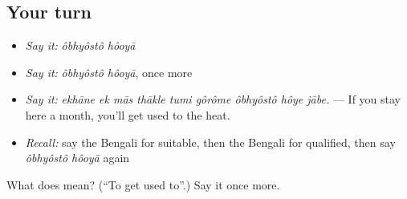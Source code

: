 \subsection*{Your turn}
\begin{itemize}
\raggedright
  \item \emph{Say it:} \emph{ôbhyôstô hôoyā}
  \item \emph{Say it:} \emph{ôbhyôstô hôoyā}, once more
  \item \emph{Say it:} \emph{ekhāne ek mās thākle tumi gôrôme ôbhyôstô hôye jābe.} — If you stay here a month, you'll get used to the heat.
  \item \emph{Recall:} say the Bengali for suitable, then the Bengali for qualified, then say \emph{ôbhyôstô hôoyā} again
\end{itemize}

\begin{tcolorbox}[breakable,colback=teal!4,colframe=teal!35!black,title={Before you move on}]
What does   mean? (\textquotedblleft{}To get used to\textquotedblright{}.) Say it once more.
\end{tcolorbox}
